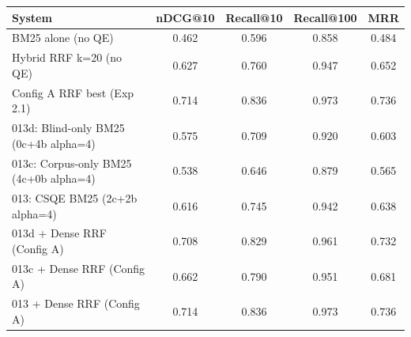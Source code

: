\begin{tabular}{lcccc}
\toprule
System & nDCG@10 & Recall@10 & Recall@100 & MRR \\
\midrule
BM25 alone (no QE) & 0.462 & 0.596 & 0.858 & 0.484 \\
Hybrid RRF k=20 (no QE) & 0.627 & 0.760 & 0.947 & 0.652 \\
Config A RRF best (Exp 2.1) & 0.714 & 0.836 & 0.973 & 0.736 \\
013d: Blind-only BM25 (0c+4b alpha=4) & 0.575 & 0.709 & 0.920 & 0.603 \\
013c: Corpus-only BM25 (4c+0b alpha=4) & 0.538 & 0.646 & 0.879 & 0.565 \\
013: CSQE BM25 (2c+2b alpha=4) & 0.616 & 0.745 & 0.942 & 0.638 \\
013d + Dense RRF (Config A) & 0.708 & 0.829 & 0.961 & 0.732 \\
013c + Dense RRF (Config A) & 0.662 & 0.790 & 0.951 & 0.681 \\
013 + Dense RRF (Config A) & 0.714 & 0.836 & 0.973 & 0.736 \\
\bottomrule
\end{tabular}
